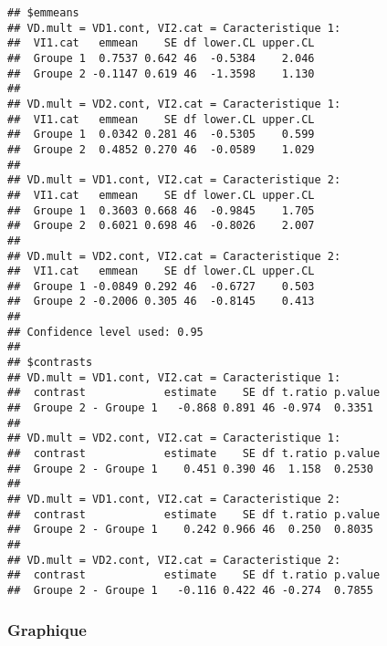 \documentclass[
]{book}
\begin{document}
\begin{verbatim}
## $emmeans
## VD.mult = VD1.cont, VI2.cat = Caracteristique 1:
##  VI1.cat   emmean    SE df lower.CL upper.CL
##  Groupe 1  0.7537 0.642 46  -0.5384    2.046
##  Groupe 2 -0.1147 0.619 46  -1.3598    1.130
## 
## VD.mult = VD2.cont, VI2.cat = Caracteristique 1:
##  VI1.cat   emmean    SE df lower.CL upper.CL
##  Groupe 1  0.0342 0.281 46  -0.5305    0.599
##  Groupe 2  0.4852 0.270 46  -0.0589    1.029
## 
## VD.mult = VD1.cont, VI2.cat = Caracteristique 2:
##  VI1.cat   emmean    SE df lower.CL upper.CL
##  Groupe 1  0.3603 0.668 46  -0.9845    1.705
##  Groupe 2  0.6021 0.698 46  -0.8026    2.007
## 
## VD.mult = VD2.cont, VI2.cat = Caracteristique 2:
##  VI1.cat   emmean    SE df lower.CL upper.CL
##  Groupe 1 -0.0849 0.292 46  -0.6727    0.503
##  Groupe 2 -0.2006 0.305 46  -0.8145    0.413
## 
## Confidence level used: 0.95 
## 
## $contrasts
## VD.mult = VD1.cont, VI2.cat = Caracteristique 1:
##  contrast            estimate    SE df t.ratio p.value
##  Groupe 2 - Groupe 1   -0.868 0.891 46 -0.974  0.3351 
## 
## VD.mult = VD2.cont, VI2.cat = Caracteristique 1:
##  contrast            estimate    SE df t.ratio p.value
##  Groupe 2 - Groupe 1    0.451 0.390 46  1.158  0.2530 
## 
## VD.mult = VD1.cont, VI2.cat = Caracteristique 2:
##  contrast            estimate    SE df t.ratio p.value
##  Groupe 2 - Groupe 1    0.242 0.966 46  0.250  0.8035 
## 
## VD.mult = VD2.cont, VI2.cat = Caracteristique 2:
##  contrast            estimate    SE df t.ratio p.value
##  Groupe 2 - Groupe 1   -0.116 0.422 46 -0.274  0.7855
\end{verbatim}

\hypertarget{graphique-20}{%
\subsubsection{Graphique}\label{graphique-20}}
\end{document}
